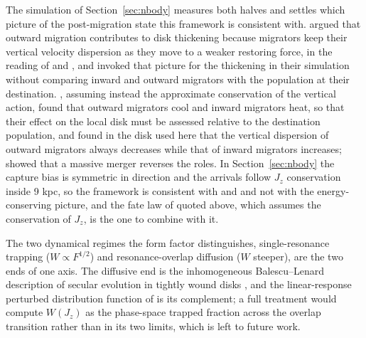 \documentclass[twocolumn]{aastex701}
\newcommand{\Jz}{J_z}
\begin{document}
The simulation of Section~\ref{sec:nbody} measures both halves and settles which
picture of the post-migration state this framework is consistent with.
\citet{SchonrichBinney2009} argued that outward migration contributes to disk
thickening because migrators keep their vertical velocity dispersion as they move to a
weaker restoring force, in the reading of \citet{Loebman2011} and \citet{Roskar2013},
and \citet{Loebman2011} invoked that picture for the thickening in their simulation
without comparing inward and outward migrators with the population at their
destination. \citet{Minchev2012thickening}, assuming instead the approximate
conservation of the vertical action, found that outward migrators cool and inward
migrators heat, so that their effect on the local disk must be assessed relative to
the destination population, and \citet{VeraCiro2014} found in the disk used here that
the vertical dispersion of outward migrators always decreases while that of inward
migrators increases; \citet{MinchevChiappiniMartig2014} showed that a massive merger
reverses the roles. In Section~\ref{sec:nbody} the capture bias is symmetric in
direction and the arrivals follow $\Jz$ conservation inside 9 kpc, so the framework
is consistent with \citet{Minchev2012thickening} and \citet{VeraCiro2014} and not with
the energy-conserving picture, and the fate law of \citet{Roskar2013} quoted above,
which assumes the conservation of $\Jz$, is the one to combine with it.

The two dynamical regimes the form factor distinguishes, single-resonance
trapping ($W\propto F^{1/2}$) and resonance-overlap diffusion ($W$ steeper), are
the two ends of one axis. The diffusive end is the inhomogeneous Balescu--Lenard
description of secular evolution in tightly wound disks \citep{Fouvry2015}, and the
linear-response perturbed distribution function of \citet{MonariFamaeySiebert2016}
is its complement; a full treatment would compute $W(\Jz)$ as the phase-space
trapped fraction across the overlap transition rather than in its two limits, which is
left to future work.
\end{document}
